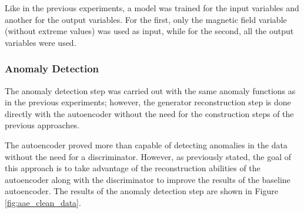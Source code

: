 Like in the previous experiments, a model was trained for the input variables and another for the output variables. For the first, only the magnetic field variable (without extreme values) was used as input, while for the second, all the output variables were used.

\subsubsection*{Anomaly Detection}

The anomaly detection step was carried out with the same anomaly functions as in the previous experiments; however, the generator reconstruction step is done directly with the autoencoder without the need for the construction steps of the previous approaches.


The autoencoder proved more than capable of detecting anomalies in the data without the need for a discriminator. However, as previously stated, the goal of this approach is to take advantage of the reconstruction abilities of the autoencoder along with the discriminator to improve the results of the baseline autoencoder. The results of the anomaly detection step are shown in Figure \ref{fig:aae_clean_data}.

